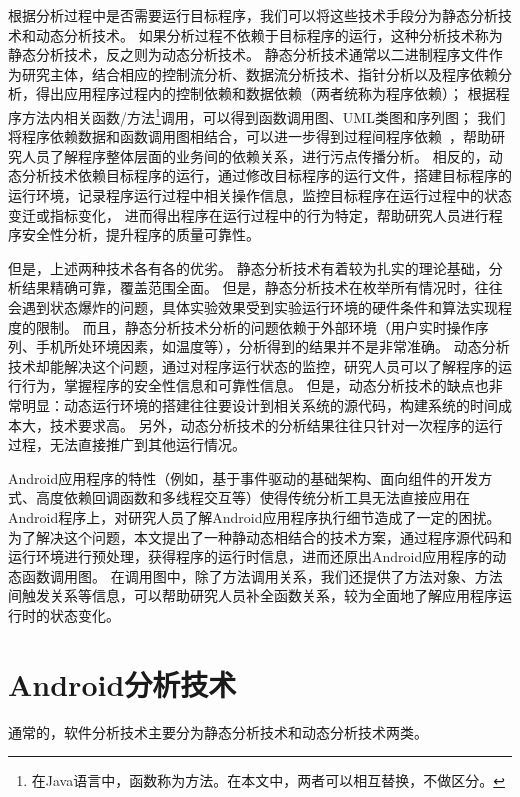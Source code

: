 根据分析过程中是否需要运行目标程序，我们可以将这些技术手段分为静态分析技术和动态分析技术。
如果分析过程不依赖于目标程序的运行，这种分析技术称为静态分析技术，反之则为动态分析技术。
静态分析技术通常以二进制程序文件作为研究主体，结合相应的控制流分析、数据流分析技术、指针分析以及程序依赖分析，得出应用程序过程内的控制依赖和数据依赖（两者统称为程序依赖）；
根据程序方法内相关函数/方法\footnote{在Java语言中，函数称为方法。在本文中，两者可以相互替换，不做区分。}调用，可以得到函数调用图、UML类图和序列图；
我们将程序依赖数据和函数调用图相结合，可以进一步得到过程间程序依赖~\cite{stafford2000formal}，帮助研究人员了解程序整体层面的业务间的依赖关系，进行污点传播分析。
相反的，动态分析技术依赖目标程序的运行，通过修改目标程序的运行文件，搭建目标程序的运行环境，记录程序运行过程中相关操作信息，监控目标程序在运行过程中的状态变迁或指标变化，
进而得出程序在运行过程中的行为特定，帮助研究人员进行程序安全性分析，提升程序的质量可靠性。

但是，上述两种技术各有各的优劣。
静态分析技术有着较为扎实的理论基础，分析结果精确可靠，覆盖范围全面。
但是，静态分析技术在枚举所有情况时，往往会遇到状态爆炸的问题，具体实验效果受到实验运行环境的硬件条件和算法实现程度的限制。
而且，静态分析技术分析的问题依赖于外部环境（用户实时操作序列、手机所处环境因素，如温度等），分析得到的结果并不是非常准确。
动态分析技术却能解决这个问题，通过对程序运行状态的监控，研究人员可以了解程序的运行行为，掌握程序的安全性信息和可靠性信息。
但是，动态分析技术的缺点也非常明显：动态运行环境的搭建往往要设计到相关系统的源代码，构建系统的时间成本大，技术要求高。
另外，动态分析技术的分析结果往往只针对一次程序的运行过程，无法直接推广到其他运行情况。

Android应用程序的特性（例如，基于事件驱动的基础架构、面向组件的开发方式、高度依赖回调函数和多线程交互等）使得传统分析工具无法直接应用在Android程序上，对研究人员了解Android应用程序执行细节造成了一定的困扰。
为了解决这个问题，本文提出了一种静动态相结合的技术方案，通过程序源代码和运行环境进行预处理，获得程序的运行时信息，进而还原出Android应用程序的动态函数调用图。
在调用图中，除了方法调用关系，我们还提供了方法对象、方法间触发关系等信息，可以帮助研究人员补全函数关系，较为全面地了解应用程序运行时的状态变化。




\section{Android分析技术}

通常的，软件分析技术主要分为静态分析技术和动态分析技术两类。

